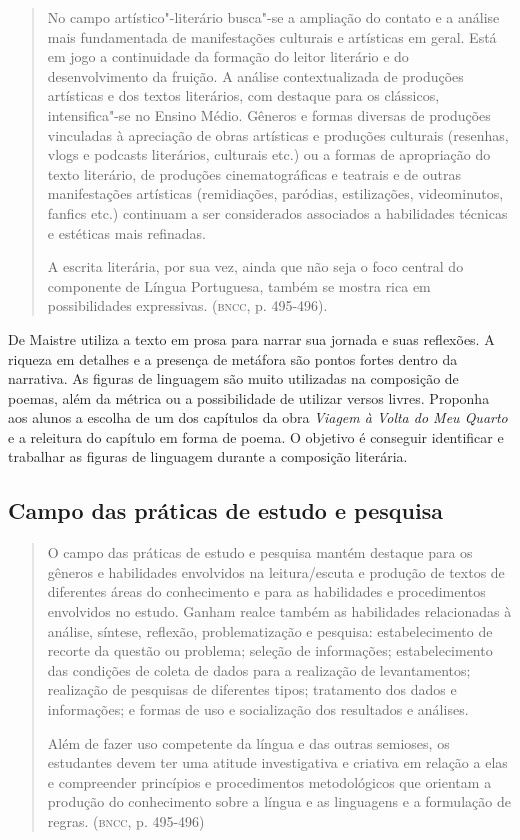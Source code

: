 \documentclass[12pt]{extarticle}
\begin{document}
\begin{quote}
No campo artístico"-literário busca"-se a ampliação do contato e a
análise mais fundamentada de manifestações culturais e artísticas em
geral. Está em jogo a continuidade da formação do leitor literário e do
desenvolvimento da fruição. A análise contextualizada de produções
artísticas e dos textos literários, com destaque para os clássicos,
intensifica"-se no Ensino Médio. Gêneros e formas diversas de produções
vinculadas à apreciação de obras artísticas e produções culturais
(resenhas, vlogs e podcasts literários, culturais etc.) ou a formas de
apropriação do texto literário, de produções cinematográficas e teatrais
e de outras manifestações artísticas (remidiações, paródias,
estilizações, videominutos, fanfics etc.) continuam a ser considerados
associados a habilidades técnicas e estéticas mais refinadas.

A escrita literária, por sua vez, ainda que não seja o foco central do
componente de Língua Portuguesa, também se mostra rica em possibilidades
expressivas. (\textsc{bncc}, p. 495-496).
\end{quote}

De Maistre utiliza a texto em prosa para narrar sua jornada e suas
reflexões. A riqueza em detalhes e a presença de metáfora são pontos
fortes dentro da narrativa. As figuras de linguagem são muito
utilizadas na composição de poemas, além da métrica ou a possibilidade
de utilizar versos livres. Proponha aos alunos a escolha de um dos
capítulos da obra \emph{Viagem à Volta do Meu Quarto} e a releitura do
capítulo em forma de poema. O objetivo é conseguir identificar e
trabalhar as figuras de linguagem durante a composição literária.

\subsection{Campo das práticas de estudo e pesquisa}

\begin{quote}
O campo das práticas de estudo e pesquisa mantém destaque para os
gêneros e habilidades envolvidos na leitura/escuta e produção de textos
de diferentes áreas do conhecimento e para as habilidades e
procedimentos envolvidos no estudo. Ganham realce também as habilidades
relacionadas à análise, síntese, reflexão, problematização e pesquisa:
estabelecimento de recorte da questão ou problema; seleção de
informações; estabelecimento das condições de coleta de dados para a
realização de levantamentos; realização de pesquisas de diferentes
tipos; tratamento dos dados e informações; e formas de uso e
socialização dos resultados e análises.

Além de fazer uso competente da língua e das outras semioses, os
estudantes devem ter uma atitude investigativa e criativa em relação a
elas e compreender princípios e procedimentos metodológicos que orientam
a produção do conhecimento sobre a língua e as linguagens e a formulação
de regras. (\textsc{bncc}, p. 495-496)
\end{quote}
\end{document}
